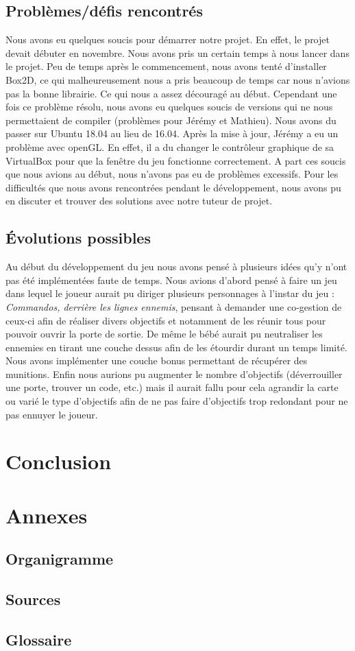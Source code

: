 \documentclass{article}
\begin{document}
\subsection{Problèmes/défis rencontrés}
Nous avons eu quelques soucis pour démarrer notre projet. En effet, le projet devait débuter en novembre. Nous avons pris un certain temps à nous lancer dans le projet. Peu de temps après le commencement, nous avons tenté d'installer Box2D, ce qui malheureusement nous a pris beaucoup de temps car nous n'avions pas la bonne librairie. Ce qui nous a assez découragé au début. Cependant une fois ce problème résolu, nous avons eu quelques soucis de versions qui ne nous permettaient de compiler (problèmes pour Jérémy et Mathieu). Nous avons du passer sur Ubuntu 18.04 au lieu de 16.04. Après la mise à jour, Jérémy a eu un problème avec openGL. En effet, il a du changer le contrôleur graphique de sa VirtualBox pour que la fenêtre du jeu fonctionne correctement. A part ces soucis que nous avions au début, nous n'avons pas eu de problèmes excessifs. Pour les difficultés que nous avons rencontrées pendant le développement, nous avons pu en discuter et trouver des solutions avec notre tuteur de projet.

\subsection{\'Evolutions possibles}
Au début du développement du jeu nous avons pensé à plusieurs idées qu'y n'ont pas été implémentées faute de temps. Nous avions d'abord pensé à faire un jeu dans lequel le joueur aurait pu diriger plusieurs personnages à l'instar du jeu : \textit{Commandos, derrière les lignes ennemis}, pensant à demander une co-gestion de ceux-ci afin de réaliser divers objectifs et notamment de les réunir tous pour pouvoir ouvrir la porte de sortie. De même le bébé aurait pu \og neutraliser \fg les ennemies en tirant une couche dessus afin de les étourdir durant un temps limité. Nous avons implémenter une couche bonus permettant de récupérer des munitions.\bigbreak
Enfin nous aurions pu augmenter le nombre d'objectifs (déverrouiller une porte, trouver un code, etc.) mais il aurait fallu pour cela agrandir la carte ou varié le type d'objectifs afin de ne pas faire d'objectifs trop redondant pour ne pas ennuyer le joueur.



\section{Conclusion}

\section{Annexes}
\subsection{Organigramme}
\subsection{Sources}
\subsection{Glossaire}
\end{document}
